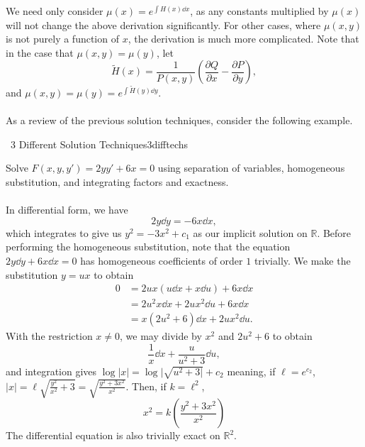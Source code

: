         We need only consider \(\mu(x)=e^{\int H(x)\dd x}\), as any constants multiplied by \(\mu(x)\) will not change the above derivation significantly. For other cases, where \(\mu(x,y)\) is not purely a function of \(x\), the derivation is much more complicated. Note that in the case that \(\mu(x,y)=\mu(y)\), let
        \begin{equation*}
            \tilde{H}(x)=\frac{1}{P(x,y)}\left(\frac{\partial Q}{\partial x}-\frac{\partial P}{\partial y}\right),
        \end{equation*}
        and \(\mu(x,y)=\mu(y)=e^{\int \tilde{H}(y) \dd y}\).
        \pagebreak
        \\
        \\
        As a review of the previous solution techniques, consider the following example.
        \begin{example}{\Difficulty\,\Difficulty\,\,3 Different Solution Techniques}{3difftechs}

            Solve \(F(x,y,y')=2yy'+6x=0\) using separation of variables, homogeneous substitution, and integrating factors and exactness.
            \\
            \\
            In differential form, we have
            \begin{equation*}
                2y\dd y=-6x\dd x,
            \end{equation*}
            which integrates to give us \(y^2=-3x^2+c_1\) as our implicit solution on \(\mathbb{R}\). Before performing the homogeneous substitution, note that the equation \(2y\dd y+6x\dd x=0\) has homogeneous coefficients of order \(1\) trivially. We make the substitution \(y=ux\) to obtain
            \begin{align*}
                0&=2ux(u\dd x+x\dd u)+6x\dd x \\
                &=2u^2x\dd x+2ux^2\dd u+6x\dd x \\
                &=x(2u^2+6)\dd x+2ux^2\dd u.
            \end{align*}
            With the restriction \(x\neq0\), we may divide by \(x^2\) and \(2u^2+6\) to obtain
            \begin{equation*}
                \frac{1}{x}\dd x+\frac{u}{u^2+3}\dd u,
            \end{equation*}
            and integration gives \(\log|x|=\log|\sqrt{u^2+3|}+c_2\) meaning, if \(\ell=e^{c_2}\), \(|x|=\ell\sqrt{\frac{y^2}{x^2}+3}=\sqrt{\frac{y^2+3x^2}{x^2}}\). Then, if \(k=\ell^2\),
            \begin{equation*}
                x^2=k\left(\frac{y^2+3x^2}{x^2}\right)
            \end{equation*}
            The differential equation is also trivially exact on \(\mathbb{R}^2\).
            
        \end{example}

